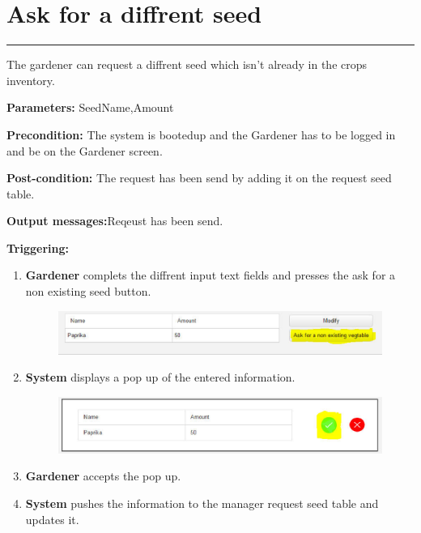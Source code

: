 \section{Ask for a diffrent seed}

\hrule
\hfill
\vspace{0.5cm}

\label{operation:Ask for a diffrent seed}

The gardener can request a diffrent seed which isn't already in the crops
inventory.
\begin{description}
\item \textbf{Parameters:} SeedName,Amount
\item \textbf{Precondition:} The system is bootedup and the Gardener has to be
logged in and be on the Gardener screen.
\item \textbf{Post-condition:} The request has been send by adding it on the
request seed table.
\item \item \textbf{Output messages:}Reqeust has been send.
\item \textbf{Triggering:}
\begin{enumerate}
\item \textbf{Gardener} complets the diffrent input text fields and presses
the ask for a non existing seed button.
\begin{figure}[H]
\includegraphics[width=1\textwidth]{images/AskForANonExistingVegtable.eps}
\end{figure}
\item \textbf{System} displays a pop up of the entered information.
\begin{figure}[H]
\includegraphics[width=1\textwidth]{images/AskForANonExistingVegtablePopUp.eps}
\end{figure}
\item \textbf{Gardener} accepts the pop up.
\item \textbf{System} pushes the information to the manager request seed table
and updates it.
\end{enumerate}
\end{description}

